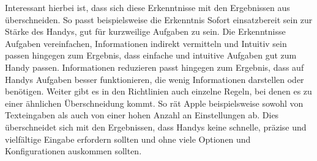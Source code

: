 %
%
Interessant hierbei ist, dass sich diese Erkenntnisse mit den Ergebnissen aus  überschneiden. %
	So passt beispielsweise die Erkenntnis \glqq Sofort einsatzbereit sein\grqq{} zur Stärke des Handys, gut für kurzweilige Aufgaben zu sein. Die Erkenntnisse \glqq Aufgaben vereinfachen\grqq{}, \glqq Informationen indirekt vermitteln\grqq{} und \glqq Intuitiv sein\grqq{} passen hingegen zum Ergebnis, dass einfache und intuitive Aufgaben gut zum Handy passen.  \glqq Informationen reduzieren\grqq{} passt hingegen zum Ergebnis, dass auf Handys Aufgaben besser funktionieren, die wenig Informationen darstellen oder benötigen.\newline%
	Weiter gibt es in den Richtlinien auch einzelne Regeln, bei denen es zu einer ähnlichen Überschneidung kommt. 
		So rät Apple beispielsweise sowohl von Texteingaben als auch von einer hohen Anzahl an Einstellungen ab\cite{konventionen_patterns_enteringData,konventionen_settings}. Dies überschneidet sich mit den Ergebnissen, dass Handys keine schnelle, präzise und vielfältige Eingabe erfordern sollten und ohne viele Optionen und Konfigurationen auskommen sollten.